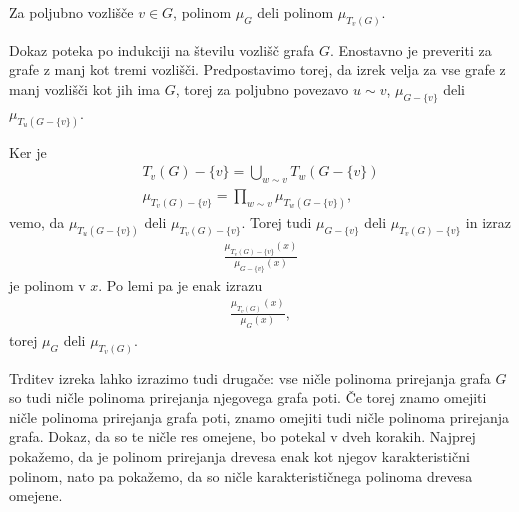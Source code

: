 \begin{izrek}
    Za poljubno vozlišče \(v\in G\), polinom \(\mu_G\) deli polinom \(\mu_{T_v(G)}\).
\end{izrek}
\begin{dokaz}
    Dokaz poteka po indukciji na številu vozlišč grafa \(G\). Enostavno je preveriti za grafe z manj kot tremi vozlišči. Predpostavimo torej, da izrek velja za vse grafe z manj vozlišči kot jih ima \(G\), torej za poljubno povezavo \(u\sim v\), \(\mu_{G-\{v\}}\) deli \(\mu_{T_u(G-\{v\})}\).

    Ker je
    \begin{align*}
        T_v(G) - \{v\} = \bigcup_{w\sim v} T_w(G-\{v\})\\
        \mu_{T_v(G) - \{v\}} = \prod_{w\sim v} \mu_{T_w(G-\{v\})},
    \end{align*}
    vemo, da \(\mu_{T_u(G-\{v\})}\) deli \(\mu_{T_v(G) - \{v\}}\). Torej tudi \(\mu_{G-\{v\}}\) deli \(\mu_{T_v(G) - \{v\}}\) in izraz
    \begin{align*}
        \frac{\mu_{T_v(G) - \{v\}}(x)}{\mu_{G-\{v\}}(x)}
    \end{align*}
    je polinom v \(x\). Po lemi pa je enak izrazu
    \begin{align*}
        \frac{\mu_{T_v(G)}(x)}{\mu_{G}(x)},
    \end{align*}
    torej \(\mu_G\) deli \(\mu_{T_v(G)}\).
\end{dokaz}

Trditev izreka lahko izrazimo tudi drugače: vse ničle polinoma prirejanja grafa \(G\) so tudi ničle polinoma prirejanja njegovega grafa poti. Če torej znamo omejiti ničle polinoma prirejanja grafa poti, znamo omejiti tudi ničle polinoma prirejanja grafa. Dokaz, da so te ničle res omejene, bo potekal v dveh korakih. Najprej pokažemo, da je polinom prirejanja drevesa enak kot njegov karakteristični polinom, nato pa pokažemo, da so ničle karakterističnega polinoma drevesa omejene.

